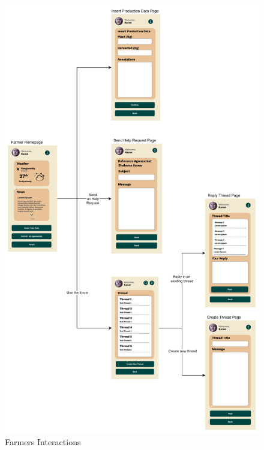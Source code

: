 \documentclass[table, 12pt]{article}
\begin{document}
\begin{center}
    \begin{figure}[H]
        \vspace{-120px}
        \includegraphics[scale=0.6, center]{assets/MockUp/FarmerInteraction.png}
        \caption{Farmers Interactions}
        \label{fig: farmerInter}
    \end{figure}
\end{center}
\end{document}
